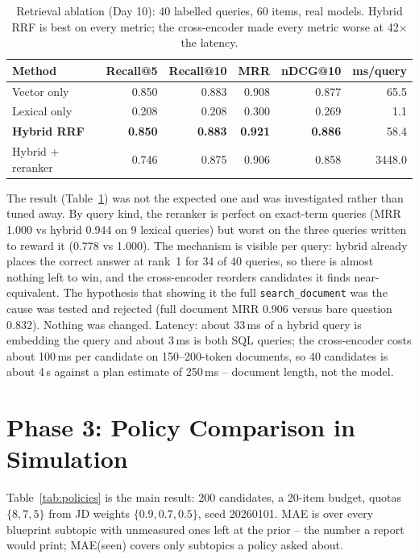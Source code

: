 \documentclass{tietreport}
\begin{document}
\begin{table}[htbp]
\centering\small
\begin{tabular}{lrrrrr}
  \toprule
  \textbf{Method} & \textbf{Recall@5} & \textbf{Recall@10} & \textbf{MRR} & \textbf{nDCG@10} & \textbf{ms/query} \\
  \midrule
  Vector only & 0.850 & 0.883 & 0.908 & 0.877 & 65.5 \\
  Lexical only & 0.208 & 0.208 & 0.300 & 0.269 & 1.1 \\
  \textbf{Hybrid RRF} & \textbf{0.850} & \textbf{0.883} & \textbf{0.921} & \textbf{0.886} & 58.4 \\
  Hybrid + reranker & 0.746 & 0.875 & 0.906 & 0.858 & 3448.0 \\
  \bottomrule
\end{tabular}
\caption{Retrieval ablation (Day 10): 40 labelled queries, 60 items, real models. Hybrid RRF is best on every metric; the cross-encoder made every metric worse at 42$\times$ the latency.}
\label{tab:retrieval}
\end{table}

The result (Table~\ref{tab:retrieval}) was not the expected one and was investigated rather than
tuned away. By query kind, the reranker is perfect on exact-term queries (MRR 1.000 vs hybrid
0.944 on 9 lexical queries) but worst on the three queries written to reward it (0.778 vs
1.000). The mechanism is visible per query: hybrid already places the correct answer at rank~1
for 34 of 40 queries, so there is almost nothing left to win, and the cross-encoder reorders
candidates it finds near-equivalent. The hypothesis that showing it the full
\texttt{search\_document} was the cause was tested and rejected (full document MRR 0.906 versus bare
question 0.832). Nothing was changed. Latency: about 33\,ms of a hybrid query is embedding the
query and about 3\,ms is both SQL queries; the cross-encoder costs about 100\,ms per candidate on
150--200-token documents, so 40 candidates is about 4\,s against a plan estimate of 250\,ms --
document length, not the model.

\section{Phase 3: Policy Comparison in Simulation}
\label{sec:policy-results}

Table~\ref{tab:policies} is the main result: 200 candidates, a 20-item budget, quotas $\{8,7,5\}$
from JD weights $\{0.9,0.7,0.5\}$, seed 20260101. MAE is over every blueprint subtopic with
unmeasured ones left at the prior -- the number a report would print; MAE(seen) covers only
subtopics a policy asked about.
\end{document}
